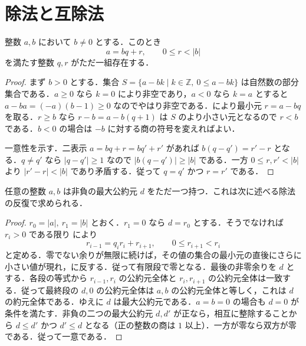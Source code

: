 \section{除法と互除法}
\begin{prop}[整数の除法算法]
整数 $a,b$ において $b\ne0$ とする．このとき
\[
 a=bq+r,\qquad 0\leq r<|b|
\]
を満たす整数 $q,r$ がただ一組存在する．
\end{prop}
\begin{proof}
まず $b>0$ とする．集合 $S=\{a-bk\mid k\in\mathbb Z,\ 0\leq a-bk\}$ は自然数の部分集合である．$a\geq0$ なら $k=0$ により非空であり，$a<0$ なら $k=a$ とすると $a-ba=(-a)(b-1)\geq0$ なのでやはり非空である．により最小元 $r=a-bq$ を取る．$r\geq b$ なら $r-b=a-b(q+1)$ は $S$ のより小さい元となるので $r<b$ である．$b<0$ の場合は $-b$ に対する商の符号を変えればよい．

一意性を示す．二表示 $a=bq+r=bq'+r'$ があれば $b(q-q')=r'-r$ となる．$q\ne q'$ なら $|q-q'|\geq1$ なので $|b(q-q')|\geq|b|$ である．一方 $0\leq r,r'<|b|$ より $|r'-r|<|b|$ であり矛盾する．従って $q=q'$ かつ $r=r'$ である．
\end{proof}
\begin{prop}[Euclidの互除法]
任意の整数 $a,b$ は非負の最大公約元 $d$ をただ一つ持つ．これは次に述べる除法の反復で求められる．
\end{prop}
\begin{proof}
$r_0=|a|,\ r_1=|b|$ とおく．$r_1=0$ なら $d=r_0$ とする．そうでなければ $r_i>0$ である限り により
\[
 r_{i-1}=q_i r_i+r_{i+1},\qquad 0\leq r_{i+1}<r_i
\]
と定める．零でない余りが無限に続けば，その値の集合の最小元の直後にさらに小さい値が現れ，に反する．従って有限段で零となる．最後の非零余りを $d$ とする．各段の等式から $r_{i-1},r_i$ の公約元全体と $r_i,r_{i+1}$ の公約元全体は一致する．従って最終段の $d,0$ の公約元全体は $a,b$ の公約元全体と等しく，これは $d$ の約元全体である．ゆえに $d$ は最大公約元である．$a=b=0$ の場合も $d=0$ が条件を満たす．非負の二つの最大公約元 $d,d'$ が正なら，相互に整除することから $d\leq d'$ かつ $d'\leq d$ となる（正の整数の商は $1$ 以上）．一方が零なら双方が零である．従って一意である．
\end{proof}
